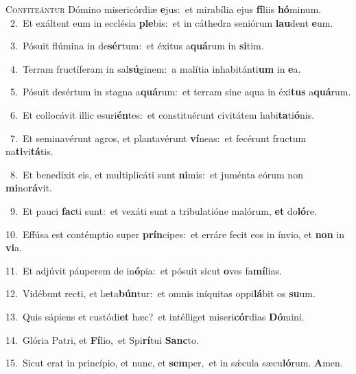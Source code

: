 \lettrine{\initial\textcolor{\initialcolor}{C}}{onfiteántur} Dómino misericórdiæ \textbf{e}\-jus:~\star et mirabília ejus \textbf{fí}\-liis \textbf{hó}\-minum.\\
{\numbfont\textcolor{\numbcolor}{~2.}}~Et exáltent eum in ecclésia \textbf{ple}\-bis:~\star et in cáthedra seniórum \textbf{lau}\-dent \textbf{e}\-um.\par
{\numbfont\textcolor{\numbcolor}{~3.}}~Pósuit flúmina in de\-\textbf{sér}\-tum:~\star et éxitus a\-\textbf{quá}\-rum in \textbf{si}\-tim.\par
{\numbfont\textcolor{\numbcolor}{~4.}}~Terram fructíferam in sal\-\textbf{sú}\-ginem:~\star a malítia inhabitánti\textbf{um} in \textbf{e}\-a.\par
{\numbfont\textcolor{\numbcolor}{~5.}}~Pósuit desértum in stagna a\-\textbf{quá}\-rum:~\star et terram sine aqua in éxi\textbf{tus} a\-\textbf{quá}\-rum.\par
{\numbfont\textcolor{\numbcolor}{~6.}}~Et collocávit illic esuri\-\textbf{én}\-tes:~\star et constituérunt civitátem habi\-\textbf{ta}\-ti\-\textbf{ó}\-nis.\par
{\numbfont\textcolor{\numbcolor}{~7.}}~Et seminavérunt agros, et plantavérunt \textbf{ví}\-neas:~\star et fecérunt fructum na\-\textbf{ti}\-vi\-\textbf{tá}\-tis.\par
{\numbfont\textcolor{\numbcolor}{~8.}}~Et benedíxit eis, et multiplicáti sunt \textbf{ni}\-mis:~\star et juménta eórum non \textbf{mi}\-no\-\textbf{rá}\-vit.\par
{\numbfont\textcolor{\numbcolor}{~9.}}~Et pauci \textbf{fac}\-ti sunt:~\star et vexáti sunt a tribulatióne malórum, \textbf{et} do\-\textbf{ló}\-re.\par
{\numbfont\textcolor{\numbcolor}{10.}}~Effúsa est contémptio super \textbf{prín}\-cipes:~\star et erráre fecit eos in ínvio, et \textbf{non} in \textbf{vi}\-a.\par
{\numbfont\textcolor{\numbcolor}{11.}}~Et adjúvit páuperem de in\-\textbf{ó}\-pia:~\star et pósuit sicut \textbf{o}\-ves fa\-\textbf{mí}\-lias.\par
{\numbfont\textcolor{\numbcolor}{12.}}~Vidébunt recti, et læta\-\textbf{bún}\-tur:~\star et omnis iníquitas oppi\-\textbf{lá}\-bit os \textbf{su}\-um.\par
{\numbfont\textcolor{\numbcolor}{13.}}~Quis sápiens et custódi\textbf{et} hæc?~\star et intélliget miseri\-\textbf{cór}\-dias \textbf{Dó}\-mini.\par
{\numbfont\textcolor{\numbcolor}{14.}}~Glória Patri, et \textbf{Fí}\-lio,~\star et Spi\-\textbf{rí}\-tui \textbf{Sanc}\-to.\par
{\numbfont\textcolor{\numbcolor}{15.}}~Sicut erat in princípio, et nunc, et \textbf{sem}\-per,~\star et in sǽcula sæcu\-\textbf{ló}\-rum. \textbf{A}\-men.\par
